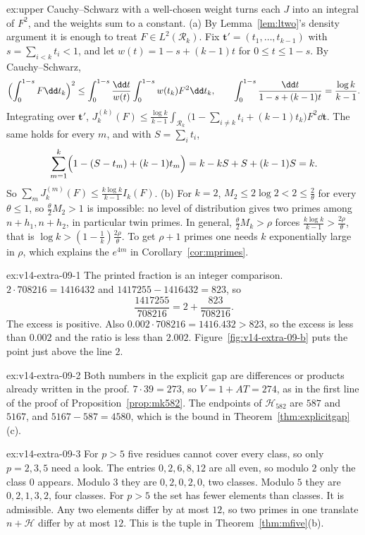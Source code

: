\begin{solution}{ex:upper}
\idea Cauchy--Schwarz with a well-chosen weight turns each $J$ into an integral of $F^2$, and the weights sum to a constant.
\writeup (a) By Lemma~\ref{lem:ltwo}'s density argument it is enough to treat $F\in L^2(\mathcal R_k)$. Fix $\mathbf t'=(t_1,\dots,t_{k-1})$ with $s=\sum_{i<k}t_i<1$, and let $w(t)=1-s+(k-1)t$ for $0\le t\le1-s$. By Cauchy--Schwarz,
\[
\Bigl(\int_0^{1-s}F\dd t_k\Bigr)^2\le\int_0^{1-s}\frac{\dd t}{w(t)}\int_0^{1-s}w(t_k)F^2\dd t_k,\qquad\int_0^{1-s}\frac{\dd t}{1-s+(k-1)t}=\frac{\log k}{k-1}.
\]
Integrating over $\mathbf t'$, $J_k^{(k)}(F)\le\frac{\log k}{k-1}\int_{\mathcal R_k}\bigl(1-\sum_{i\ne k}t_i+(k-1)t_k\bigr)F^2\dd\mathbf t$. The same holds for every $m$, and with $S=\sum_it_i$,
\[
\sum_{m=1}^k\Bigl(1-(S-t_m)+(k-1)t_m\Bigr)=k-kS+S+(k-1)S=k.
\]
So $\sum_mJ_k^{(m)}(F)\le\frac{k\log k}{k-1}I_k(F)$.
(b) For $k=2$, $M_2\le2\log2<2\le\frac2\theta$ for every $\theta\le1$, so $\frac\theta2M_2>1$ is impossible: no level of distribution gives two primes among $n+h_1,n+h_2$, in particular twin primes. In general, $\frac\theta2M_k>\rho$ forces $\frac{k\log k}{k-1}>\frac{2\rho}\theta$, that is $\log k>(1-\frac1k)\frac{2\rho}\theta$. To get $\rho+1$ primes one needs $k$ exponentially large in $\rho$, which explains the $e^{4m}$ in Corollary~\ref{cor:mprimes}.
\end{solution}

\begin{solution}{ex:v14-extra-09-1}
\idea The printed fraction is an integer comparison.
\writeup $2\cdot708216=1416432$ and $1417255-1416432=823$, so
\[
\frac{1417255}{708216}=2+\frac{823}{708216}.
\]
The excess is positive. Also $0.002\cdot708216=1416.432>823$, so the excess is less than $0.002$ and the ratio is less than $2.002$. Figure~\ref{fig:v14-extra-09-b} puts the point just above the line $2$.
\end{solution}

\begin{solution}{ex:v14-extra-09-2}
\idea Both numbers in the explicit gap are differences or products already written in the proof.
\writeup $7\cdot39=273$, so $V=1+AT=274$, as in the first line of the proof of Proposition~\ref{prop:mk582}. The endpoints of $\mathcal H_{582}$ are $587$ and $5167$, and $5167-587=4580$, which is the bound in Theorem~\ref{thm:explicitgap}(c).
\end{solution}

\begin{solution}{ex:v14-extra-09-3}
\idea For $p>5$ five residues cannot cover every class, so only $p=2,3,5$ need a look.
\writeup The entries $0,2,6,8,12$ are all even, so modulo $2$ only the class $0$ appears. Modulo $3$ they are $0,2,0,2,0$, two classes. Modulo $5$ they are $0,2,1,3,2$, four classes. For $p>5$ the set has fewer elements than classes. It is admissible. Any two elements differ by at most $12$, so two primes in one translate $n+\mathcal H$ differ by at most $12$. This is the tuple in Theorem~\ref{thm:mfive}(b).
\end{solution}


